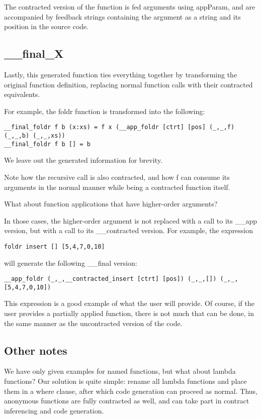 \documentclass[10pt,a4paper]{article}
\begin{document}
The contracted version of the function is fed arguments using appParam, and are accompanied by feedback strings containing the argument as a string and its position in the source code.

\subsection{\_\_final\_X}

Lastly, this generated function ties everything together by transforming the original function definition, replacing normal function calls with their contracted equivalents.

For example, the foldr function is transformed into the following:

\begin{lstlisting}
__final_foldr f b (x:xs) = f x (__app_foldr [ctrt] [pos] (_,_,f) (_,_,b) (_,_,xs))
__final_foldr f b [] = b
\end{lstlisting}

We leave out the generated information for brevity.

Note how the recursive call is also contracted, and how f can consume its arguments in the normal manner while being a contracted function itself.

What about function applications that have higher-order arguments?

In those cases, the higher-order argument is not replaced with a call to its \_\_app version, but with a call to its \_\_contracted version.
For example, the expression

\begin{lstlisting}
foldr insert [] [5,4,7,0,10]
\end{lstlisting}

will generate the following \_\_final version:

\begin{lstlisting}
__app_foldr (_,_,__contracted_insert [ctrt] [pos]) (_,_,[]) (_,_,[5,4,7,0,10])
\end{lstlisting}

This expression is a good example of what the user will provide.
Of course, if the user provides a partially applied function, there is not much that can be done, in the same manner as the uncontracted version of the code.

\subsection{Other notes}
We have only given examples for named functions, but what about lambda functions? Our solution is quite simple: rename all lambda functions and place them in a where clause, after which code generation can proceed as normal.
Thus, anonymous functions are fully contracted as well, and can take part in contract inferencing and code generation.
\end{document}
